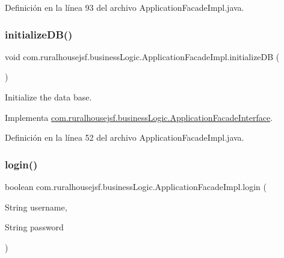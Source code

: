 Definición en la línea 93 del archivo Application\+Facade\+Impl.\+java.

\mbox{\label{classcom_1_1ruralhousejsf_1_1business_logic_1_1_application_facade_impl_a1e6cbb70c9568899c86135b3264b431d}} 
\subsubsection{\texorpdfstring{initializeDB()}{initializeDB()}}
{\footnotesize\ttfamily void com.\+ruralhousejsf.\+business\+Logic.\+Application\+Facade\+Impl.\+initialize\+DB (\begin{DoxyParamCaption}{ }\end{DoxyParamCaption})}

Initialize the data base. 

Implementa \mbox{\hyperlink{interfacecom_1_1ruralhousejsf_1_1business_logic_1_1_application_facade_interface_a4670319006cee17060e0c84695d7195f}{com.\+ruralhousejsf.\+business\+Logic.\+Application\+Facade\+Interface}}.



Definición en la línea 52 del archivo Application\+Facade\+Impl.\+java.

\mbox{\label{classcom_1_1ruralhousejsf_1_1business_logic_1_1_application_facade_impl_a7af883dece6a0de1e1be2b83e3d4a23f}} 
\subsubsection{\texorpdfstring{login()}{login()}}
{\footnotesize\ttfamily boolean com.\+ruralhousejsf.\+business\+Logic.\+Application\+Facade\+Impl.\+login (\begin{DoxyParamCaption}\item[{String}]{username,  }\item[{String}]{password }\end{DoxyParamCaption})}

